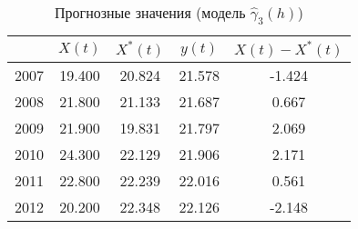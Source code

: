 \begin{table}[H]
\centering
\caption{Прогнозные значения (модель $ \widehat{\gamma}_3(h) $)} 
\label{table:lin-fit-cv-prediction}
\begin{tabular}{r|cccc}
  \hline
 & $X(t)$ & $X^{*}(t)$ & $y(t)$ & $ X(t) - X^{*}(t) $ \\ 
  \hline
2007 & 19.400 & 20.824 & 21.578 & -1.424 \\ 
  2008 & 21.800 & 21.133 & 21.687 & 0.667 \\ 
  2009 & 21.900 & 19.831 & 21.797 & 2.069 \\ 
  2010 & 24.300 & 22.129 & 21.906 & 2.171 \\ 
  2011 & 22.800 & 22.239 & 22.016 & 0.561 \\ 
  2012 & 20.200 & 22.348 & 22.126 & -2.148 \\ 
   \hline
\end{tabular}
\end{table}

